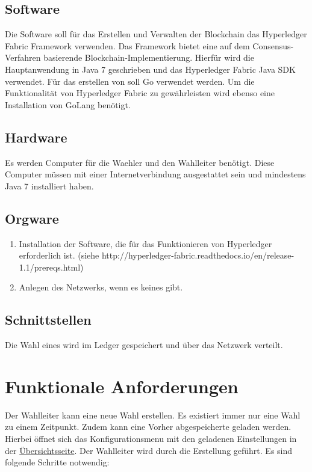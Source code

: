 \documentclass[parskip=full,11pt,twoside]{scrartcl}
\begin{document}
\subsection{Software}
Die Software soll für das Erstellen und Verwalten der \gls{Blockchain} das Hyperledger Fabric Framework verwenden. Das Framework bietet eine auf dem \gls{Consensus-Verfahren} basierende Blockchain-Implementierung.
Hierfür wird die Hauptanwendung in Java 7 geschrieben und das Hyperledger Fabric Java SDK verwendet. Für das erstellen von  soll Go verwendet werden.
Um die Funktionalität von Hyperledger Fabric zu gewährleisten wird ebenso eine Installation von GoLang benötigt.

\subsection{Hardware}
Es werden Computer für die \gls{Waehler} und den \gls{Wahlleiter} benötigt. Diese Computer müssen mit einer Internetverbindung ausgestattet sein und mindestens Java 7 installiert haben.

\pagebreak

\subsection{Orgware}
\begin{enumerate}
\item Installation der Software, die für das Funktionieren von Hyperledger erforderlich ist. (siehe http://hyperledger-fabric.readthedocs.io/en/release-1.1/prereqs.html)
\item Anlegen des Netzwerks, wenn es keines gibt.
\end{enumerate}

\subsection{Schnittstellen}
Die \gls{Wahl} eines  wird im \gls{Ledger} gespeichert und über das \gls{Netzwerk} verteilt.

\section{Funktionale Anforderungen}

Der \gls{Wahlleiter} kann eine neue \gls{Wahl} erstellen. Es existiert immer nur eine \gls{Wahl} zu einem Zeitpunkt.
Zudem kann eine Vorher abgespeicherte  geladen werden. Hierbei öffnet sich das \gls{Konfigurationsmenu} mit den geladenen Einstellungen in der \hyperref[fig:wlltr-done]{Übersichtsseite}.
Der \gls{Wahlleiter} wird durch die Erstellung geführt. Es sind folgende Schritte notwendig:
\end{document}

